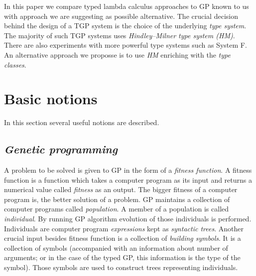 \documentclass[11pt]{article}
\newcommand{\Lets}{Let us\xspace}
\newcommand{\HM}{Hindley–Milner\xspace}
\newcommand{\red}[1]{{\color{red} #1}}
\begin{document}
\begin{article}
In this paper we compare typed lambda calculus approaches to GP known to us with approach we are suggesting as possible alternative. The crucial decision behind the design of a TGP system is the choice of the underlying \textit{type system}.
The majority of such TGP systems uses \textit{\HM type system (HM)}. There are also experiments with more powerful type systems such as System F. An alternative approach we proposse is to use \textit{HM} enriching with the \textit{type classes}.  


\section{Basic notions} %

In this section several useful notions 
are described.

\subsection{\textit{Genetic programming}}

A problem to be solved is given to GP in the form of a \textit{fitness function}. A fitness function is a function which takes a computer program as its input and  returns a numerical value called \textit{fitness} as an output. The bigger fitness of a computer program is, the better solution of a problem.
GP maintains a collection of computer programs called \textit{population}.  A member of a population is called \textit{individual}. By running GP algorithm evolution of those individuals is performed. Individuals are computer program \textit{expressions} kept as \textit{syntactic trees}. Another crucial input besides fitness function is a collection of \textit{building symbols}. It is a collection of symbols (accompanied with an information about number of arguments; or in the case of the typed GP, this information is the type of the symbol). Those symbols are used to construct trees representing individuals.



\end{article}
\end{document}
